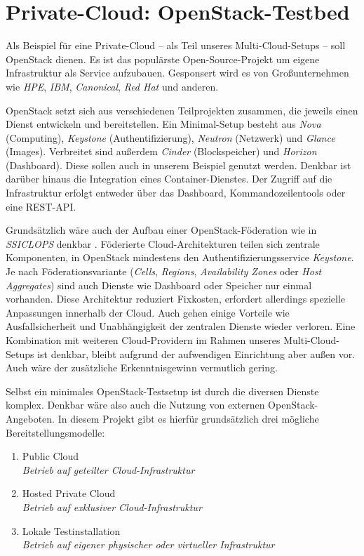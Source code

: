 \section{Private-Cloud: OpenStack-Testbed}

Als Beispiel für eine Private-Cloud -- als Teil unseres Multi-Cloud-Setups -- soll OpenStack dienen. Es ist das populärste Open-Source-Projekt um eigene Infrastruktur als Service aufzubauen. Gesponsert wird es von Großunternehmen wie \emph{HPE}, \emph{IBM}, \emph{Canonical}, \emph{Red Hat} und anderen.

OpenStack setzt sich aus verschiedenen Teilprojekten zusammen, die jeweils einen Dienst entwickeln und bereitstellen. Ein Minimal-Setup besteht aus \emph{Nova} (Computing), \emph{Key\-stone} (Authentifizierung), \emph{Neutron} (Netzwerk) und \emph{Glance} (Images). Verbreitet sind außerdem \emph{Cinder} (Blockspeicher) und \emph{Horizon} (Dash\-board). Diese sollen auch in unserem Beispiel genutzt werden. Denkbar ist darüber hinaus die Integration eines Container-Dienstes. Der Zugriff auf die Infrastruktur erfolgt entweder über das Dashboard, Kommandozeilentools oder eine REST-API.

Grundsätzlich wäre auch der Aufbau einer OpenStack-Föderation wie in \emph{SSICLOPS} denkbar \cite{ssiclops:2015:d6.1-project-presentation}. Föderierte Cloud-Architekturen teilen sich zentrale Komponenten, in OpenStack mindestens den Authentifizierungsservice \emph{Keystone}. Je nach Föderationsvariante (\emph{Cells}, \emph{Regions}, \emph{Availability Zones} oder \emph{Host Aggregates}) sind auch Dienste wie Dashboard oder Speicher nur einmal vorhanden. Diese Architektur reduziert Fixkosten, erfordert allerdings spezielle Anpassungen innerhalb der Cloud. Auch gehen einige Vorteile wie Ausfallsicherheit und Unabhängigkeit der zentralen Dienste wieder verloren. Eine Kombination mit weiteren Cloud-Providern im Rahmen unseres Multi-Cloud-Setups ist denkbar, bleibt aufgrund der aufwendigen Einrichtung aber außen vor. Auch wäre der zusätzliche Erkenntnisgewinn vermutlich gering.

Selbst ein minimales OpenStack-Testsetup ist durch die diversen Dienste komplex. Denkbar wäre also auch die Nutzung von externen OpenStack-Angeboten. In diesem Projekt gibt es hierfür grundsätzlich drei mögliche Bereitstellungsmodelle: 

\begin{enumerate}
	\item Public Cloud
	\\\emph{Betrieb auf geteilter Cloud-Infrastruktur}
	
	\item Hosted Private Cloud
	\\\emph{Betrieb auf exklusiver Cloud-Infrastruktur}
	
	\item Lokale Testinstallation
	\\\emph{Betrieb auf eigener physischer oder virtueller Infrastruktur}
\end{enumerate}

